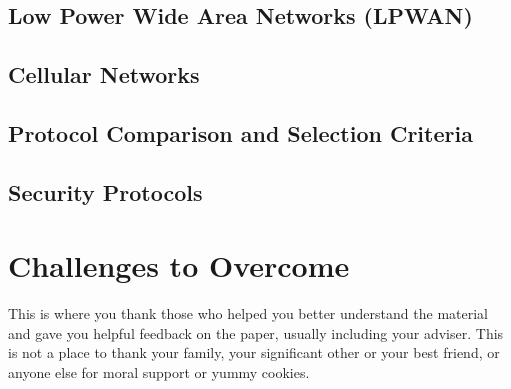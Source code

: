 \documentclass[sigplan,screen,nonacm]{acmart}
\begin{document}
\subsection{Low Power Wide Area Networks (LPWAN)}
\label{subsec:Low Power Wide Area Networks (LPWAN)}

\subsection{Cellular Networks}
\label{subsec:Cellular Networks}

\subsection{Protocol Comparison and Selection Criteria}
\label{subsec:Protocol Comparison and Selection Criteria}

\subsection{Security Protocols}
\label{subsec:Security Protocols}

\section{Challenges to Overcome}
\label{sec:Challenges to Overcome}


\begin{acks}
  This is where you thank those who helped you better understand the material
  and gave you helpful feedback on the paper, usually including your adviser.
  This is not a place to thank your family, your significant other or your best friend,
  or anyone else  for moral support or yummy cookies.
\end{acks}



\end{document}
